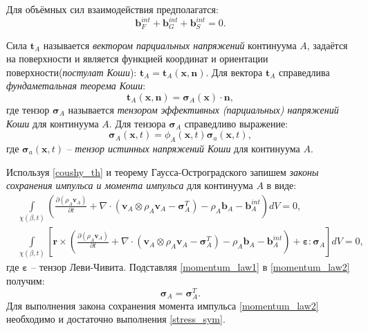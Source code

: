 	Для объёмных сил взаимодействия предполагатся:
\begin{equation}
	\label{force_int}
	\boldsymbol{b}_F^{int} + \boldsymbol{b}_G^{int} + \boldsymbol{b}_S^{int} = 0.
\end{equation}
	
	Сила $\boldsymbol{t}_A$ называется \textit{вектором парциальных напряжений} континуума $A$, задаётся на поверхности и является функцией координат и ориентации поверхности(\textit{постулат Коши}): $\boldsymbol{t}_A = \boldsymbol{t}_A(\boldsymbol{x}, \boldsymbol{n})$. Для вектора $\boldsymbol{t}_A$ справедлива \textit{фундаметальная теорема Коши}:
\begin{equation}
	\label{coushy_th}
	\boldsymbol{t}_A(\boldsymbol{x}, \boldsymbol{n}) = \boldsymbol{\sigma}_A(\boldsymbol{x}) \cdot \boldsymbol{n}, 
\end{equation}
	где тензор $\boldsymbol{\sigma}_A$ называется \textit{тензором эффективных (парциальных) напряжений Коши} для континуума $A$. Для тензора $\boldsymbol{\sigma}_A$ справедливо выражение:
\begin{equation}
	\label{stress_tensor}
	\boldsymbol{\sigma}_A(\boldsymbol{x}, t) = \phi_A(\boldsymbol{x}, t) \boldsymbol{\sigma}_a(\boldsymbol{x}, t),
\end{equation}
	где $\boldsymbol{\sigma}_a(\boldsymbol{x}, t)$ -- \textit{тензор истинных напряжений Коши} для континуума $A$.

	Используя \eqref{coushy_th} и теорему Гаусса-Остроградского запишем \textit{законы сохранения импульса и момента импульса} для континуума $A$ в виде:
\begin{align}
	\label{momentum_law1}
	&\int\limits_{\chi(\beta, t)} \left( \frac{\partial (\rho_A \boldsymbol{v}_A)}{\partial t} 
	+ \nabla \cdot \left( \boldsymbol{v}_A \otimes \rho_A\boldsymbol{v}_A - \boldsymbol{\sigma}^T_A \right) - \rho_A \boldsymbol{b}_A - \boldsymbol{b}_A^{int} \right) dV = 0,\\
	\label{momentum_law2}
	&\int\limits_{\chi(\beta, t)} \left[ \boldsymbol{r} \times \left( \frac{\partial (\rho_A \boldsymbol{v}_A)}{\partial t} 
	+ \nabla \cdot \left( \boldsymbol{v}_A \otimes \rho_A\boldsymbol{v}_A - \boldsymbol{\sigma}^T_A \right) - \rho_A \boldsymbol{b}_A - \boldsymbol{b}_A^{int} \right) + \boldsymbol{\varepsilon} : \boldsymbol{\sigma}_A \right] dV = 0,
\end{align}
	где $\boldsymbol{\varepsilon}$ -- тензор Леви-Чивита. Подставляя \eqref{momentum_law1} в \eqref{momentum_law2} получим:
\begin{equation}
	\label{stress_sym}
	\boldsymbol{\sigma}_A = \boldsymbol{\sigma}_A^T.
\end{equation}
	Для выполнения закона сохранения момента импульса \eqref{momentum_law2} необходимо и достаточно выполнения \eqref{stress_sym}.
	
